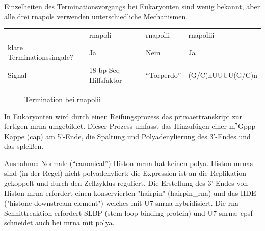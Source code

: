 
Einzelheiten des Terminationsvorgangs bei Eukaryonten sind wenig bekannt, aber alle drei \glspl{rnapol} verwenden unterschiedliche Mechanismen.\cite{Knust2025_9}

\begin{table}[H]
    \centering
    \begin{tabular}{llll}
        & \gls{rnapoli}         & \gls{rnapolii} & \gls{rnapoliii}  \\
        klare Terminationssingale?
        & Ja                    & Nein           & Ja               \\
        Signal                     & 18 bp Seq Hilfsfaktor & ``Torperdo''   & (G/C)nUUUU(G/C)n
    \end{tabular}\label{tab:table8}
\end{table}


\begin{figure}[H]
    \centering
    \caption{Termination bei \gls{rnapolii}}\label{fig:figure10}
\end{figure}


In Eukaryonten wird durch einen Reifungsprozess das \gls{primaertranskript} zur fertigen \gls{mrna} umgebildet.
Dieser Prozess umfasst das Hinzufügen einer m$^7$Gppp‐Kappe (\gls{cap}) am 5'-Ende, die Spaltung und
Polyadenylierung des
3'-Endes und das \gls{spleißen}. \cite{Knust2025_9}

Ausnahme: Normale (``canonical'') Histon-\gls{mrna} hat keinen \gls{polya}.
Histon-\gls{mrna}s sind (in der Regel) nicht polyadenyliert; die Expression ist an die Replikation
gekoppelt und durch den Zellzyklus reguliert.
Die Erstellung des 3’ Endes von Histon \gls{mrna} erfordert einen konservierten "hairpin" (\gls{hairpin_rna}) und
das HDE ("histone downstream element") welches mit U7 \gls{snrna} hybridisiert.
Die \gls{rna}-Schnittreaktion erfordert SLBP (stem-loop binding protein) und U7 \gls{snrna}; \gls{cpsf}
schneidet auch bei \gls{mrna} mit \gls{polya}.



